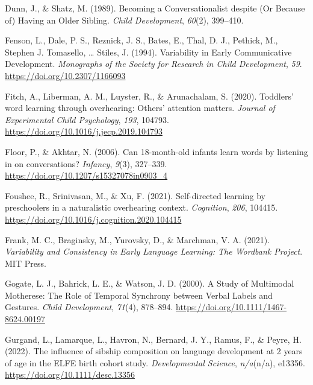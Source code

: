 \documentclass[
  man,mask,floatsintext]{apa6}
\newlength{\cslhangindent}
\newlength{\cslentryspacingunit} %
\newenvironment{CSLReferences}[2] %
 {%
  \setlength{\parindent}{0pt}
  \ifodd #1
  \let\oldpar\par
  \def\par{\hangindent=\cslhangindent\oldpar}
  \fi
  \setlength{\parskip}{#2\cslentryspacingunit}
 }%
 {}
\begin{document}
\begin{CSLReferences}{1}{0}
\leavevmode{}%
Dunn, J., \& Shatz, M. (1989). Becoming a {Conversationalist} despite ({Or} {Because} of) {Having} an {Older} {Sibling}. \emph{Child Development}, \emph{60}(2), 399--410.

\leavevmode{}%
Fenson, L., Dale, P. S., Reznick, J. S., Bates, E., Thal, D. J., Pethick, M., Stephen J. Tomasello, \ldots{} Stiles, J. (1994). Variability in {Early} {Communicative} {Development}. \emph{Monographs of the Society for Research in Child Development}, \emph{59}. \url{https://doi.org/10.2307/1166093}

\leavevmode{}%
Fitch, A., Liberman, A. M., Luyster, R., \& Arunachalam, S. (2020). Toddlers' word learning through overhearing: {Others}' attention matters. \emph{Journal of Experimental Child Psychology}, \emph{193}, 104793. \url{https://doi.org/10.1016/j.jecp.2019.104793}

\leavevmode{}%
Floor, P., \& Akhtar, N. (2006). Can 18-month-old infants learn words by listening in on conversations? \emph{Infancy}, \emph{9}(3), 327--339. \url{https://doi.org/10.1207/s15327078in0903_4}

\leavevmode{}%
Foushee, R., Srinivasan, M., \& Xu, F. (2021). Self-directed learning by preschoolers in a naturalistic overhearing context. \emph{Cognition}, \emph{206}, 104415. \url{https://doi.org/10.1016/j.cognition.2020.104415}

\leavevmode{}%
Frank, M. C., Braginsky, M., Yurovsky, D., \& Marchman, V. A. (2021). \emph{Variability and {Consistency} in {Early} {Language} {Learning}: {The} {Wordbank} {Project}}. MIT Press.

\leavevmode{}%
Gogate, L. J., Bahrick, L. E., \& Watson, J. D. (2000). A {Study} of {Multimodal} {Motherese}: {The} {Role} of {Temporal} {Synchrony} between {Verbal} {Labels} and {Gestures}. \emph{Child Development}, \emph{71}(4), 878--894. \url{https://doi.org/10.1111/1467-8624.00197}

\leavevmode{}%
Gurgand, L., Lamarque, L., Havron, N., Bernard, J. Y., Ramus, F., \& Peyre, H. (2022). The influence of sibship composition on language development at 2 years of age in the {ELFE} birth cohort study. \emph{Developmental Science}, \emph{n/a}(n/a), e13356. \url{https://doi.org/10.1111/desc.13356}


\end{CSLReferences}
\end{document}
